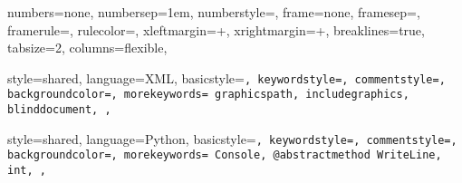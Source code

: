 \usepackage{setspace}
\usepackage{lipsum}
\usepackage{tocloft}
\usepackage{longtable}
\usepackage{tabu}
\usepackage{booktabs}
\usepackage[square,sort,comma,numbers]{natbib}
\usepackage{url}
\usepackage[nottoc]{tocbibind}

\usepackage{todonotes}

\usepackage{morefloats}
\usepackage{float}

\usepackage{soul}

\usepackage{cleveref}
\usepackage{multicol}


\renewcommand{\cftsecleader}{\cftdotfill{\cftdotsep}}


\usepackage{amssymb}

\newenvironment{dummy}{}{}
\usepackage{tikz}
\usetikzlibrary{calc}
\newcommand\HRule{\rule{\textwidth}{1pt}}

\usepackage{accsupp}
\newcommand*{\noaccsupp}[1]{\BeginAccSupp{ActualText={}}#1\EndAccSupp{}}

\usepackage{xcolor}
\usepackage{listings}

{
    numbers=none,
    numbersep=1em,
    numberstyle=\tiny\color{red}\noaccsupp,
    frame=none,
    framesep=\fboxsep,
    framerule=\fboxrule,
    rulecolor=\color{red},
    xleftmargin=\dimexpr\fboxsep+\fboxrule\relax,
    xrightmargin=\dimexpr\fboxsep+\fboxrule\relax,
    breaklines=true,
    tabsize=2,
    columns=flexible,
}


{
    style=shared,
    language={XML},
    basicstyle=\small\tt,
    keywordstyle=\color{blue},
    commentstyle=\color[rgb]{0.13,0.54,0.13},
    backgroundcolor=\color{yellow!10},
    morekeywords={
        graphicspath,
        includegraphics,
        blinddocument,
    },
}

{
    style=shared,
    language={Python},
    basicstyle=\small\tt\linespread{0.4},
    keywordstyle=\color{blue},
    commentstyle=\color[rgb]{0.13,0.54,0.13},
    backgroundcolor=\color{cyan!10},
    morekeywords={
        Console,
        @abstractmethod
        WriteLine,
        int,
    },
}

{\lstset{style=xml}}
{}

{\lstset{style=python}}
{}
 
\lstset{style=python}
\linespread{1.0}

